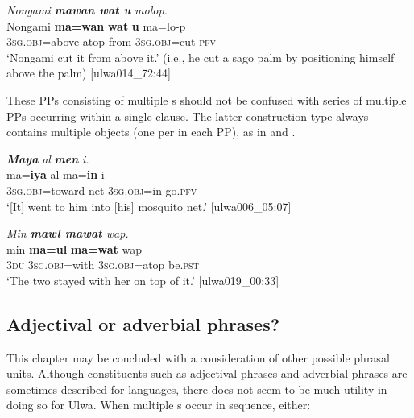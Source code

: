 \ea%
    \label{ex:phrase:103}
          \textit{Nongami \textbf{mawan wat u} molop.}\\
\gll    Nongami  \textbf{ma=wan}      \textbf{wat}  \textbf{u}    ma=lo-p\\
    [name]    3\textsc{sg.obj}=above  atop  from  3\textsc{sg.obj}=cut-\textsc{pfv}\\
\glt `Nongami cut it from above it.’ (i.e., he cut a sago palm by positioning himself above the palm) [ulwa014\_72:44]
\z

These PPs consisting of multiple s should not be confused with series of multiple PPs occurring within a single clause. The latter construction type always contains multiple objects (one per  in each PP), as in  and .


\ea%
    \label{ex:phrase:104}
          \textbf{\textit{Maya}} \textit{al} \textbf{\textit{men}} \textit{i.}\\
\gll    ma=\textbf{iya}      al  ma=\textbf{in}      i\\
    3\textsc{sg.obj}=toward  net  3\textsc{sg.obj=}in  go.\textsc{pfv}\\ 
\glt `[It] went to him into [his] mosquito net.’ [ulwa006\_05:07]
\z

\ea%
    \label{ex:phrase:105}
          \textit{Min \textbf{mawl mawat} wap.}\\
\gll    min  \textbf{ma=ul}      \textbf{ma=wat}    wap\\
    3\textsc{du}  3\textsc{sg.obj}=with  3\textsc{sg.obj}=atop  be.\textsc{pst}\\
\glt `The two stayed with her on top of it.’ [ulwa019\_00:33]
\z

\subsection{Adjectival or adverbial phrases?}\label{sec:9.3.2}


This chapter may be concluded with a consideration of other possible phrasal units. Although constituents such as adjectival phrases and adverbial phrases are sometimes described for languages, there does not seem to be much utility in doing so for Ulwa. When multiple s occur in sequence, either:
  
